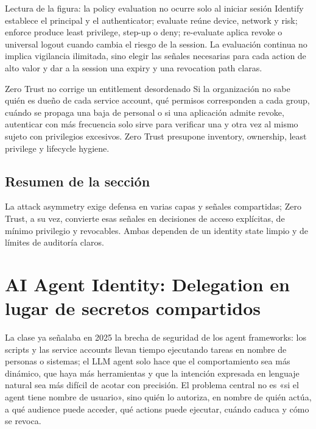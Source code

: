 \documentclass[a4paper]{article}
\begin{document}
\begin{knowledgebox}{Lectura de la figura: la policy evaluation no ocurre solo al iniciar sesión}
Identify establece el principal y el authenticator; evaluate reúne device, network y risk; enforce produce least privilege, step-up o deny; re-evaluate aplica revoke o universal logout cuando cambia el riesgo de la session. La evaluación continua no implica vigilancia ilimitada, sino elegir las señales necesarias para cada action de alto valor y dar a la session una expiry y una revocation path claras.
\end{knowledgebox}

\begin{warningbox}{Zero Trust no corrige un entitlement desordenado}
Si la organización no sabe quién es dueño de cada service account, qué permisos corresponden a cada group, cuándo se propaga una baja de personal o si una aplicación admite revoke, autenticar con más frecuencia solo sirve para verificar una y otra vez al mismo sujeto con privilegios excesivos. Zero Trust presupone inventory, ownership, least privilege y lifecycle hygiene.
\end{warningbox}

\subsection{Resumen de la sección}

La attack asymmetry exige defensa en varias capas y señales compartidas; Zero Trust, a su vez, convierte esas señales en decisiones de acceso explícitas, de mínimo privilegio y revocables. Ambas dependen de un identity state limpio y de límites de auditoría claros.
\section{AI Agent Identity: Delegation en lugar de secretos compartidos}

La clase ya señalaba en 2025 la brecha de seguridad de los agent frameworks: los scripts y las service accounts llevan tiempo ejecutando tareas en nombre de personas o sistemas; el LLM agent solo hace que el comportamiento sea más dinámico, que haya más herramientas y que la intención expresada en lenguaje natural sea más difícil de acotar con precisión. El problema central no es «si el agent tiene nombre de usuario», sino quién lo autoriza, en nombre de quién actúa, a qué audience puede acceder, qué actions puede ejecutar, cuándo caduca y cómo se revoca.
\end{document}
